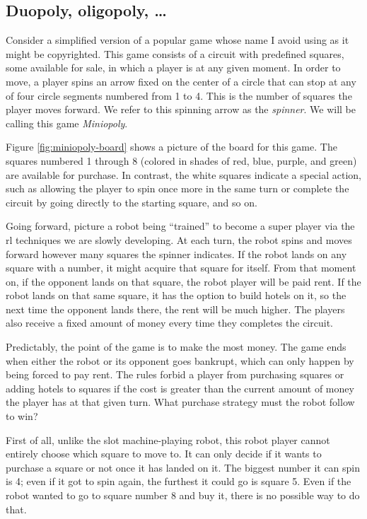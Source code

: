 \subsection{Duopoly, oligopoly, \ldots}

Consider a simplified version of a popular game whose name I avoid using as it
might be copyrighted. This game consists of a circuit with predefined squares,
some available for sale, in which a player is at any given moment. In order to
move, a player spins an arrow fixed on the center of a circle that can stop at
any of four circle segments numbered from 1 to 4. This is the number of squares
the player moves forward. We refer to this spinning arrow as the
\textit{spinner}. We will be calling this game \emph{Miniopoly}.

Figure \ref{fig:miniopoly-board} shows a picture of the board for this game. The
squares numbered 1 through 8 (colored in shades of red, blue, purple, and green)
are available for purchase. In contrast, the white squares indicate a special
action, such as allowing the player to spin once more in the same turn or
complete the circuit by going directly to the starting square, and so on.

Going forward, picture a robot being ``trained'' to become a super player via
the \ac{rl} techniques we are slowly developing. At each turn, the robot spins
and moves forward however many squares the spinner indicates. If the robot lands
on any square with a number, it might acquire that square for itself. From that
moment on, if the opponent lands on that square, the robot player will be paid
rent. If the robot lands on that same square, it has the option to build hotels
on it, so the next time the opponent lands there, the rent will be much higher.
The players also receive a fixed amount of money every time they completes the
circuit.

Predictably, the point of the game is to make the most money. The game ends when
either the robot or its opponent goes bankrupt, which can only happen by being
forced to pay rent. The rules forbid a player from purchasing squares or adding
hotels to squares if the cost is greater than the current amount of money the
player has at that given turn. What purchase strategy must the robot follow to
win?

First of all, unlike the slot machine-playing robot, this robot player cannot
entirely choose which square to move to. It can only decide if it wants to
purchase a square or not once it has landed on it. The biggest number it can
spin is 4; even if it got to spin again, the furthest it could go is square 5.
Even if the robot wanted to go to square number 8 and buy it, there is no
possible way to do that.


